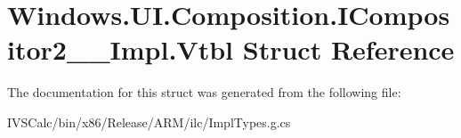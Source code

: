 \hypertarget{struct_windows_1_1_u_i_1_1_composition_1_1_i_compositor2_____impl_1_1_vtbl}{}\section{Windows.\+U\+I.\+Composition.\+I\+Compositor2\+\_\+\+\_\+\+Impl.\+Vtbl Struct Reference}
\label{struct_windows_1_1_u_i_1_1_composition_1_1_i_compositor2_____impl_1_1_vtbl}


The documentation for this struct was generated from the following file\+:\begin{DoxyCompactItemize}
\item 
I\+V\+S\+Calc/bin/x86/\+Release/\+A\+R\+M/ilc/Impl\+Types.\+g.\+cs\end{DoxyCompactItemize}
